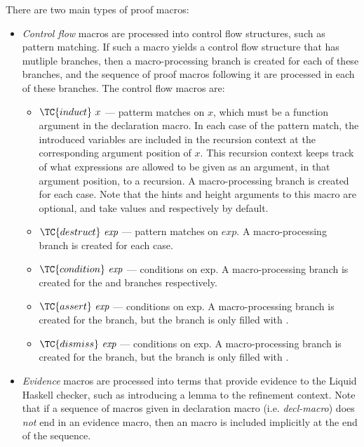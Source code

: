 There are two main types of proof macros: 
\begin{itemize}
  \item
  \textit{Control flow} macros are processed into control flow structures, such as pattern matching. 
  If such a macro yields a control flow structure that has mutliple branches, then a macro-processing branch is created for each of these branches, and the sequence of proof macros following it are processed in each of these branches.
  The control flow macros are:
  \begin{itemize}
    \item
    $\TC{induct} ~ x$ --- patterm matches on $x$, which must be a function argument in the declaration macro.
    In each case of the pattern match, the introduced variables are included in the recursion context at the corresponding argument position of $x$.
    This recursion context keeps track of what expressions are allowed to be given as an argument, in that argument position, to a recursion.
    A macro-processing branch is created for each case.
    Note that the hints and height arguments to this macro are optional, and take values \code{[]} and  respectively by default.
    \item $\TC{destruct} ~ \textit{exp}$ --- pattern matches on $\textit{exp}$. A macro-processing branch is created for each case.
    \item $\TC{condition} ~ \textit{exp}$ --- conditions on $\text{exp}$. A macro-processing branch is created for the  and  branches respectively.
    \item $\TC{assert} ~ \textit{exp}$ --- conditions on $\text{exp}$. A macro-processing branch is created for the  branch, but the  branch is only filled with .
    \item $\TC{dismiss} ~ \textit{exp}$ --- conditions on $\text{exp}$. A macro-processing branch is created for the  branch, but the  branch is only filled with .
  \end{itemize}
  \item
  \textit{Evidence} macros are processed into terms that provide evidence to the Liquid Haskell checker, such as introducing a lemma to the refinement context.
  Note that if a sequence of macros given in declaration macro (i.e. \textit{decl-macro}) does \textit{not} end in an evidence macro, then an  macro is included implicitly at the end of the sequence.

\end{itemize}
